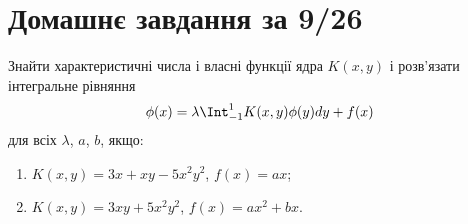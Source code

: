 \setcounter{section}{3}

\section{Домашнє завдання за 9/26}

\begin{problem}[5.23, Владимиров]
Знайти характеристичні числа і власні функції ядра $K(x, y)$ і розв'язати інтегральне рівняння 
\[ \phi(x) = \lambda \Int_{-1}^1 K(x, y) \phi(y) dy + f(x) \] 
для всіх $\lambda$, $a$, $b$, якщо:
    \begin{enumerate}
        \item $K(x, y) = 3x + xy - 5x^2y^2$, $f(x) = ax$;
        \item $K(x, y) = 3xy + 5x^2y^2$, $f(x) = ax^2 + bx$.
    \end{enumerate}
\end{problem}

